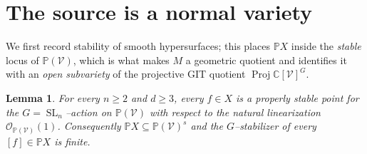 \documentclass{amsart}
\newtheorem{lemma}{Lemma}
\theoremstyle{definition}
\DeclareMathOperator{\SL}{SL}
\DeclareMathOperator{\Proj}{Proj}
\newcommand{\PP}{\mathbb{P}}
\newcommand{\CC}{\mathbb{C}}
\begin{document}
\section{The source is a normal variety}\label{sec:source}

We first record stability of smooth hypersurfaces; this places $\PP X$ inside the
\emph{stable} locus of $\PP(\mathcal V)$, which is what makes $M$ a geometric quotient and
identifies it with an \emph{open subvariety} of the projective GIT quotient $\Proj
\CC[\mathcal V]^{G}$.

\begin{lemma}\label{lem:stable}
For every $n\ge 2$ and $d\ge 3$, every $f\in X$ is a properly stable point for the
$G=\SL_n$--action on $\PP(\mathcal V)$ with respect to the natural linearization
$\mathcal O_{\PP(\mathcal V)}(1)$. Consequently $\PP X\subseteq \PP(\mathcal V)^{s}$ and the
$G$--stabilizer of every $[f]\in\PP X$ is finite.
\end{lemma}
\end{document}

